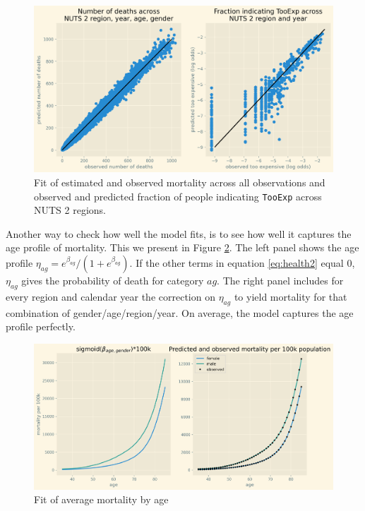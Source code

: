 \documentclass[a4paper,12pt]{article}
\begin{document}
\begin{figure}[htbp]
\centering
\includegraphics[width=.9\linewidth]{./figures/fit_baseline_model.png}
\caption{\label{fig:ModelFit}Fit of estimated and observed mortality across all observations and observed and predicted fraction of people indicating \texttt{TooExp} across NUTS 2 regions.}
\end{figure}

Another way to check how well the model fits, is to see how well it captures the age profile of mortality. This we present in Figure \ref{fig:Fit_mortality_by_age}. The left panel shows the age profile \(\eta_{ag} = e^{\beta_{ag}}/(1+e^{\beta_{ag}})\). If the other terms in equation \eqref{eq:health2} equal 0, \(\eta_{ag}\) gives the probability of death for category \(ag\). The right panel includes for every region and calendar year the correction on \(\eta_{ag}\) to yield mortality for that combination of gender/age/region/year. On average, the model captures the age profile perfectly.


\begin{figure}[htbp]
\centering
\includegraphics[width=.9\linewidth]{./figures/age_profile_baseline.png}
\caption{\label{fig:Fit_mortality_by_age}Fit of average mortality by age}
\end{figure}
\end{document}

